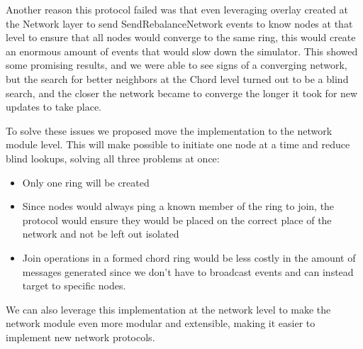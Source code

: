 Another reason this protocol failed was that even leveraging overlay created at
the Network layer to send SendRebalanceNetwork events to know nodes at that level
to ensure that all nodes would converge to the same ring, this would create an enormous
amount of events that would slow down the simulator. This showed some promising results,
and we were able to see signs of a converging network, but the search for better neighbors
at the Chord level turned out to be a blind search, and the closer the network became to
converge the longer it took for new updates to take place.

To solve these issues we proposed move the implementation to the network module level.
This will make possible to initiate one node at a time and reduce blind lookups, solving
all three problems at once: 
\begin{itemize}
  \item Only one ring will be created
  \item Since nodes would always ping a known
member of the ring to join, the protocol would ensure they would be placed on the correct place
of the network and not be left out isolated
  \item Join operations in a formed chord ring would be less costly in the amount
of messages generated since we don't have to broadcast events and can instead target
to specific nodes.
\end{itemize}

We can also leverage this implementation at the network level to make the network
module even more modular and extensible, making it easier to implement new network protocols.
